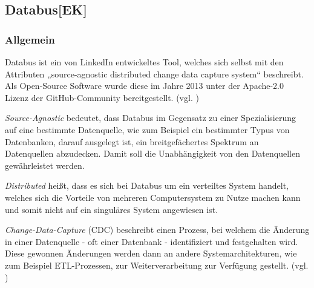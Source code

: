 \subsection{Databus[EK]}
\subsubsection{Allgemein}
Databus ist ein von LinkedIn entwickeltes Tool, welches sich selbst mit den Attributen „source-agnostic distributed change data capture system“ beschreibt. Als Open-Source Software wurde diese im Jahre 2013 unter der Apache-2.0 Lizenz der GitHub-Community bereitgestellt. 
(vgl. \cite{Databus-GitHub})
\vspace{5mm}\par
\textit{Source-Agnostic} bedeutet, dass Databus im Gegensatz zu einer Spezialisierung auf eine bestimmte Datenquelle, wie zum Beispiel ein bestimmter Typus von Datenbanken, darauf ausgelegt ist, ein breitgefächertes Spektrum an Datenquellen abzudecken. Damit soll die Unabhängigkeit von den Datenquellen gewährleistet werden.
\vspace{5mm}\par
\textit{Distributed} heißt, dass es sich bei Databus um ein verteiltes System handelt, welches sich die Vorteile von mehreren Computersystem zu Nutze machen kann und somit nicht auf ein singuläres System angewiesen ist.
\vspace{5mm}\par
\textit{Change-Data-Capture} (CDC) beschreibt einen Prozess, bei welchem die Änderung in einer Datenquelle - oft einer Datenbank - identifiziert und festgehalten wird. Diese gewonnen Änderungen werden dann an andere Systemarchitekturen, wie zum Beispiel ETL-Prozessen, zur Weiterverarbeitung zur Verfügung gestellt.
(vgl. \cite{CDC})
\newpage
